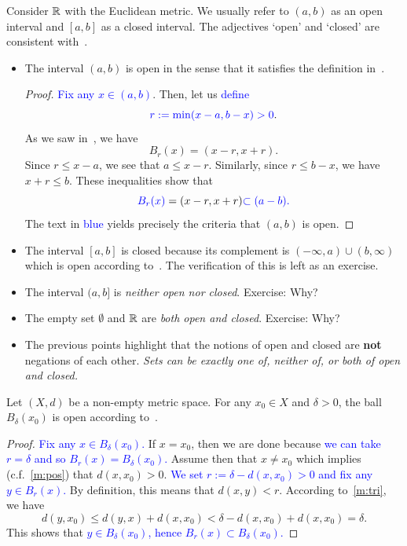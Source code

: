\begin{eg}
	\label{eg:R_open_closed}
	Consider $\mathbb{R}$ with the Euclidean metric. We usually refer to $(a,b)$ as an open interval and $[a,b]$ as a closed interval. The adjectives `open' and `closed' are consistent with~.
\begin{itemize}
	\item The interval $(a,b)$ is open in the sense that it satisfies the definition in~. 
	\begin{proof}
	\textcolor{blue}{Fix any $x \in (a,b)$}. Then, let us \textcolor{blue}{define}
	\[
	\textcolor{blue}{r:= \min (x-a,b-x)>0}.
	\]As we saw in~, we have
	\[
	B_r(x) = (x-r,x+r).
	\]
	Since $r \le x-a$, we see that $a \le x-r$. Similarly, since $r\le b-x$, we have $x+r \le b$. These inequalities show that
	\[
	\textcolor{blue}{B_r(x)} = (x-r,x+r)\textcolor{blue}{\subset (a-b).} 
	\]
	The text in \textcolor{blue}{blue} yields precisely the criteria that $(a,b)$ is open.
	\end{proof}
	\item The interval $[a,b]$ is closed because its complement is $(-\infty,a)\cup (b,\infty)$ which is open according to~. The verification of this is left as an exercise.
	\item The interval $(a,b]$ is \textit{neither open nor closed}. Exercise: Why?
	\item The empty set $\emptyset$ and $\mathbb{R}$ are \textit{both open and closed}. Exercise: Why?
	\item The previous points highlight that the notions of open and closed are \textbf{not} negations of each other. \textit{Sets can be exactly one of, neither of, or both of open and closed.}
\end{itemize}
\end{eg}
\begin{eg}
	\label{eg:balls_are_open}
	Let $(X,d)$ be a non-empty metric space. For any $x_0 \in X$ and $\delta>0$, the ball $B_\delta(x_0)$ is open according to~.
	\begin{proof}
		\textcolor{blue}{Fix any $x\in B_\delta(x_0)$.} If $x=x_0$, then we are done because \textcolor{blue}{we can take $r = \delta$ and so $B_r(x) = B_\delta(x_0)$.} Assume then that $x\neq x_0$ which implies (c.f.~\ref{m:pos}) that $d(x,x_0)>0$. \textcolor{blue}{We set $r:= \delta - d(x,x_0)>0$ and fix any $y \in B_r(x)$.} By definition, this means that $d(x,y) < r$. According to~\ref{m:tri}, we have
		\[
		d(y,x_0) \le d(y,x) + d(x,x_0) < \delta - d(x,x_0) + d(x,x_0) = \delta. 
		\]
		This shows that \textcolor{blue}{$y\in B_\delta(x_0)$, hence $B_r(x) \subset B_\delta(x_0)$.}
	\end{proof}
\end{eg}

